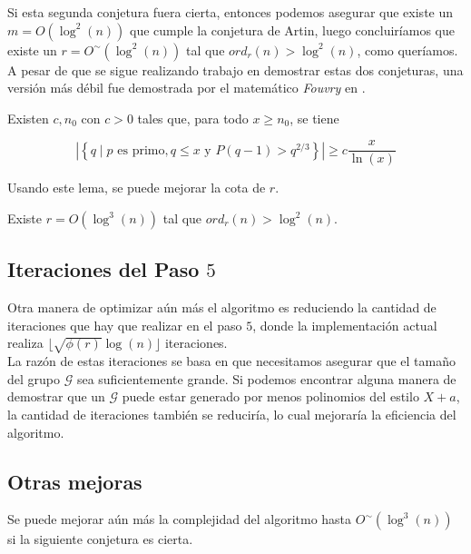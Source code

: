 Si esta segunda conjetura fuera cierta, entonces podemos asegurar que existe un $m = O(\log^2(n))$ que cumple la conjetura de Artin, luego concluiríamos que existe un $r = O^\sim(\log^2(n))$ tal que $ord_r(n) > \log^2(n)$, como queríamos.\\

A pesar de que se sigue realizando trabajo en demostrar estas dos conjeturas, una versión más débil fue demostrada por el matemático \textit{Fouvry} en \cite{fouvry_1985}.

\begin{lema}
	Existen $c, n_0$ con $c > 0$ tales que, para todo $x \geq n_0$, se tiene
	
	\begin{equation}
	|\left\{ q \mid p\text{ es primo},q \leq x\text{ y } P(q-1) > q^{2/3} \right\}| \geq c\frac{x}{\ln(x)}
	\end{equation}
\end{lema}

Usando este lema, se puede mejorar la cota de $r$.

\begin{teorema}
	Existe $r = O(\log^3(n))$ tal que $ord_r(n) > \log^2(n)$.
\end{teorema}

\subsection{Iteraciones del Paso $5$}

Otra manera de optimizar aún más el algoritmo es reduciendo la cantidad de iteraciones que hay que realizar en el paso $5$, donde la implementación actual realiza $\lfloor \sqrt{\phi(r)}\log(n) \rfloor$ iteraciones.\\

La razón de estas iteraciones se basa en que necesitamos asegurar que el tamaño del grupo $\mathcal{G}$ sea suficientemente grande. Si podemos encontrar alguna manera de demostrar que un $\mathcal{G}$ puede estar generado por menos polinomios del estilo $X + a$, la cantidad de iteraciones también se reduciría, lo cual mejoraría la eficiencia del algoritmo.

\subsection{Otras mejoras}

Se puede mejorar aún más la complejidad del algoritmo hasta $O^\sim(\log^3(n))$ si la siguiente conjetura es cierta.

